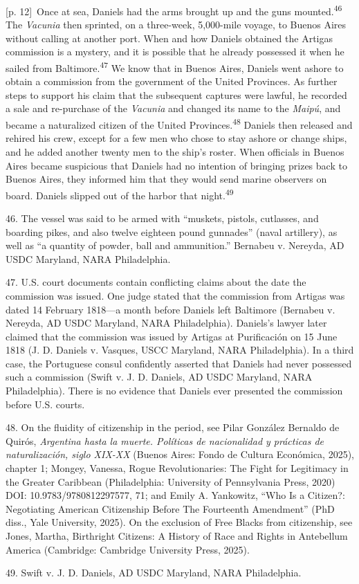 \documentclass[10pt,a4paper]{article}
\begin{document}
{\scriptsize\color{gray} [p. 12]}\ Once at sea, Daniels had the arms brought up and the guns mounted.\nobreak\textsuperscript{46} The \textit{Vacunia} then sprinted, on a three-week, 5,000-mile voyage, to Buenos Aires without calling at another port. When and how Daniels obtained the Artigas commission is a mystery, and it is possible that he already possessed it when he sailed from Baltimore.\nobreak\textsuperscript{47} We know that in Buenos Aires, Daniels went ashore to obtain a commission from the government of the United Provinces. As further steps to support his claim that the subsequent captures were lawful, he recorded a sale and re-purchase of the \textit{Vacunia} and changed its name to the \textit{Maipú}, and became a naturalized citizen of the United Provinces.\nobreak\textsuperscript{48} Daniels then released and rehired his crew, except for a few men who chose to stay ashore or change ships, and he added another twenty men to the ship’s roster. When officials in Buenos Aires became suspicious that Daniels had no intention of bringing prizes back to Buenos Aires, they informed him that they would send marine observers on board. Daniels slipped out of the harbor that night.\nobreak\textsuperscript{49}\par{\small 46. The vessel was said to be armed with “muskets, pistols, cutlasses, and boarding pikes, and also twelve eighteen pound gunnades” (naval artillery), as well as “a quantity of powder, ball and ammunition.” Bernabeu v. Nereyda, AD USDC Maryland, NARA Philadelphia.\par}{\small 47. U.S. court documents contain conflicting claims about the date the commission was issued. One judge stated that the commission from Artigas was dated 14 February 1818—a month before Daniels left Baltimore (Bernabeu v. Nereyda, AD USDC Maryland, NARA Philadelphia). Daniels’s lawyer later claimed that the commission was issued by Artigas at Purificación on 15 June 1818 (J. D. Daniels v. Vasques, USCC Maryland, NARA Philadelphia). In a third case, the Portuguese consul confidently asserted that Daniels had never possessed such a commission (Swift v. J. D. Daniels, AD USDC Maryland, NARA Philadelphia). There is no evidence that Daniels ever presented the commission before U.S. courts.\par}{\small 48. On the fluidity of citizenship in the period, see Pilar González Bernaldo de Quirós, \textit{Argentina hasta la muerte. Políticas de nacionalidad y prácticas de naturalización, siglo XIX-XX} (Buenos Aires: Fondo de Cultura Económica, 2025), chapter 1; Mongey, Vanessa, Rogue Revolutionaries: The Fight for Legitimacy in the Greater Caribbean (Philadelphia: University of Pennsylvania Press, 2020) DOI: 10.9783/9780812297577, 71; and Emily A. Yankowitz, “Who Is a Citizen?: Negotiating American Citizenship Before The Fourteenth Amendment” (PhD diss., Yale University, 2025). On the exclusion of Free Blacks from citizenship, see Jones, Martha, Birthright Citizens: A History of Race and Rights in Antebellum America (Cambridge: Cambridge University Press, 2025).\par}{\small 49. Swift v. J. D. Daniels, AD USDC Maryland, NARA Philadelphia.\par}
\end{document}
